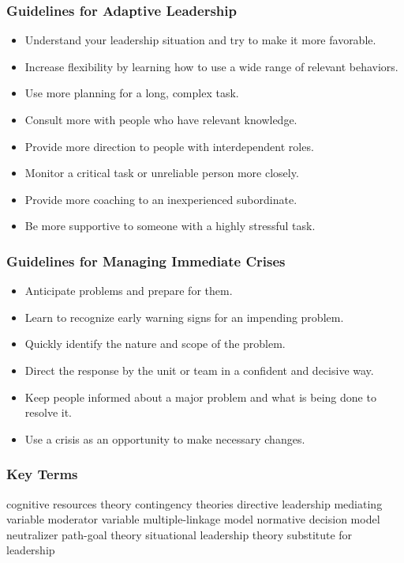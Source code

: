 
\subsubsection{Guidelines for Adaptive Leadership} %
\label{ssub:guidelines_for_adaptive_leadership}

\begin{itemize}
	\item Understand your leadership situation and try to make it more favorable.
	\item Increase flexibility by learning how to use a wide range of relevant behaviors.
	\item Use more planning for a long, complex task.
	\item Consult more with people who have relevant knowledge.
	\item Provide more direction to people with interdependent roles.
	\item Monitor a critical task or unreliable person more closely.
	\item Provide more coaching to an inexperienced subordinate.
	\item Be more supportive to someone with a highly stressful task.
\end{itemize}


\subsubsection{Guidelines for Managing Immediate Crises} %
\label{ssub:guidelines_for_managing_immediate_crises}
\begin{itemize}
	\item Anticipate problems and prepare for them.
	\item Learn to recognize early warning signs for an impending problem.
	\item Quickly identify the nature and scope of the problem.
	\item Direct the response by the unit or team in a confident and decisive way.
	\item Keep people informed about a major problem and what is being done to resolve it.
	\item Use a crisis as an opportunity to make necessary changes.
\end{itemize}

\subsubsection{Key Terms} %
\label{ssub:key_terms}
cognitive resources theory
contingency theories
directive leadership
mediating variable
moderator variable
multiple-linkage model
normative decision model
neutralizer
path-goal theory
situational leadership
theory
substitute for leadership

